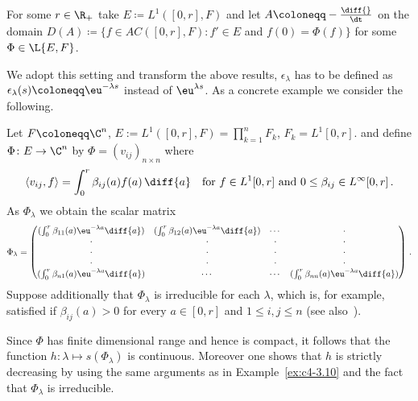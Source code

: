 For some $r \in \R_{+}$ take $E \coloneqq L^{1}([0,r], F)$ and let $A \coloneqq - \frac{\diff{}}{\dt}$ on the domain $D(A) \coloneqq \{f \in AC([0,r], F) \colon f' \in E$ and $f(0) = \Phi(f)\}$ for some $\Phi \in \L{E,F}$.

We adopt this setting and transform the above results, \eg $\epsilon_{\lambda}$ has to be defined as $\epsilon_{\lambda}(s) \coloneqq \eu^{-\lambda s}$ instead of\/ $\eu^{\lambda s}$.
As a concrete example we consider the following.


\begin{example}\label{ex:c4-3.12}
%
%
Let $F \coloneqq \C^{n}$, $E:= L^{1}([0,r],F) = \prod_{k=1}^{n} F_{k}$, $F_{k} = L^{1}[0,r]$. and define $\Phi \colon E \to \C^{n}$ by $\Phi = (v_{ij})_{{n\times n}}$ where
\[
\langle v_{ij}, f \rangle = \int_{0}^{r} \beta_{ij}(a)f(a) \, \diff{a} \quad \text{for } f \in L^{1}[0,r] \text{ and } 0 \leq \beta_{ij} \in L^{\infty}[0,r] \,.
\]
As $\Phi_{\lambda}$ we obtain the scalar matrix
\begin{equation*}\label{eq:c4-3.12-kgk2}
\Phi_{\lambda} = \begin{pmatrix}
(\int_0^r \beta_{11}(a)\eu^{-\lambda a}\diff{a}) & (\int_0^r \beta_{12}(a)\eu^{-\lambda a}\diff{a}) & \cdots & \cdot \\
\cdot & \cdot & \cdot & \cdot \\
\cdot & \cdot & \cdot & \cdot \\
\cdot & \cdot & \cdot & \cdot \\
(\int_0^r \beta_{n1}(a)\eu^{-\lambda a}\diff{a}) & \cdots & \cdots & (\int_0^r \beta_{nn}(a)\eu^{-\lambda a}\diff{a})
\end{pmatrix}\,. 
\end{equation*}
Suppose additionally that $\Phi_{\lambda}$ is irreducible for each $\lambda$, which is, for example, satisfied if\/ $\beta_{ij}(a) > 0$ for every $a \in [0,r]$ and $1 \leq i,j \leq n$ (see also \textcite[p.257ff]{bellmancooke:1963}\,).

Since $\Phi$ has finite dimensional range and hence is compact, it follows that the function $h \colon \lambda \mapsto s(\Phi_{\lambda})$ is continuous.
Moreover one shows that $h$ is strictly decreasing by using the same arguments as in Example~\ref{ex:c4-3.10} and the fact that $\Phi_{\lambda}$ is irreducible.


\end{example}
